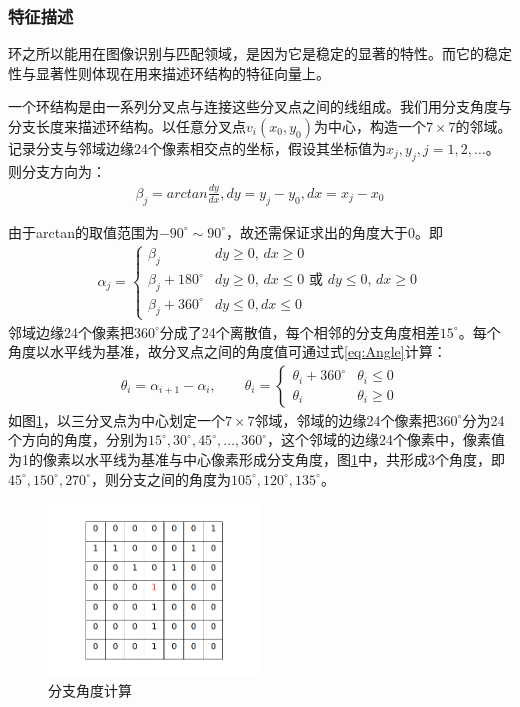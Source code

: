 \subsubsection{特征描述}
\label{}
环之所以能用在图像识别与匹配领域，是因为它是稳定的显著的特性。而它的稳定性与显著性则体现在用来描述环结构的特征向量上。

一个环结构是由一系列分叉点与连接这些分叉点之间的线组成。我们用分支角度与分支长度来描述环结构。以任意分叉点$v_i(x_0, y_0)$为中心，构造一个$7 \times 7$的邻域。记录分支与邻域边缘24个像素相交点的坐标，假设其坐标值为$x_j, y_j, j=1, 2, \ldots$。则分支方向为：
\begin{align}
\beta_j = arctan\frac{dy}{dx}, dy = y_j - y_0, dx = x_j - x_0 
\end{align}

由于arctan的取值范围为$-90^{\circ} \sim 90^{\circ}$，故还需保证求出的角度大于0。即
\begin{align}
\alpha_j = \left\{ \begin{array}{ll}
\beta_j & \textrm{$dy \geq 0$, $dx \geq 0$} \\
\beta_j + 180^{\circ} & \textrm{$dy \geq 0$, $dx \leq 0$ 或 $dy \leq 0$, $dx \geq 0$}\\
\beta_j + 360^{\circ} & \textrm{$dy \leq 0, dx \leq 0$}
\end{array} \right.
\end{align}
邻域边缘24个像素把$360^{\circ}$分成了24个离散值，每个相邻的分支角度相差$15^{\circ}$。每个角度以水平线为基准，故分叉点之间的角度值可通过式\ref{eq:Angle}计算：
\begin{align}
\theta_i = \alpha_{i+1} - \alpha_i, \qquad
\theta_i = \left\{ \begin{array}{ll}
\theta_i + 360^{\circ} & \theta_i \le 0 \\
\theta_i & \theta_i \geq 0
\end{array} \right.
\label{eq:Angle}
\end{align}
如图\ref{fig:calculate-angles}，以三分叉点为中心划定一个$7\times7$邻域，邻域的边缘24个像素把$360^{\circ}$分为24个方向的角度，分别为$15^{\circ}, 30^{\circ},45^{\circ}, \ldots, 360^{\circ}$，这个邻域的边缘24个像素中，像素值为1的像素以水平线为基准与中心像素形成分支角度，图\ref{fig:calculate-angles}中，共形成3个角度，即$45^{\circ}, 150^{\circ},270^{\circ}$，则分支之间的角度为$105^{\circ}, 120^{\circ}, 135^{\circ}$。

\begin{figure}[!ht]
\centering
\includegraphics[width=0.5\textwidth]{figures/7-7}
\caption{分支角度计算}
\label{fig:calculate-angles}
\end{figure}

